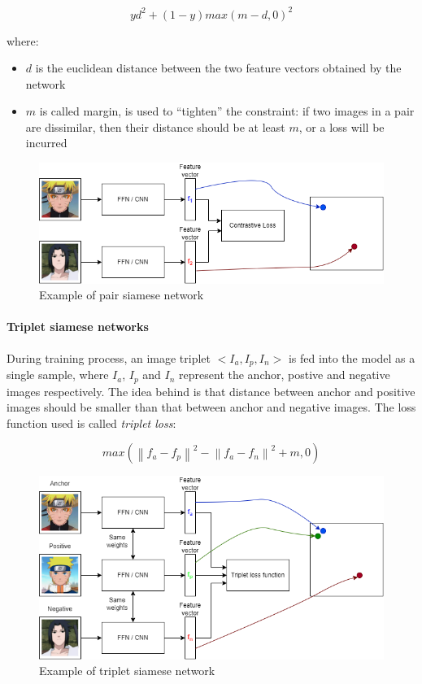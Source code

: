 \documentclass{article}
\begin{document}
$$yd^2 + (1 - y) max(m - d, 0)^2$$

where:
\begin{itemize}
    \item $d$ is the euclidean distance between the two feature vectors obtained by the network
    \item $m$ is called margin, is used to “tighten” the constraint: if two images in a pair are dissimilar, then their distance should be at least $m$, or a loss will be incurred
\end{itemize}

\begin{figure}[H]
    \centering
    \includegraphics[width=4.5in]{imgs/pairNet.png}
    \caption{Example of pair siamese network}
    \label{fig:pairNet}
\end{figure}

\paragraph{Triplet siamese networks}
During training process, an image triplet $<I_a, I_p, I_n>$ is fed into the model as a single sample, where $I_a$, $I_p$ and $I_n$ represent the anchor, postive and negative images respectively. The idea behind is that distance between anchor and positive images should be smaller than that between anchor and negative images.
The loss function used is called \textit{triplet loss}:

$$max(\left\| f_a - f_p\right\|^2 - \left\| f_a - f_n\right\|^2 + m, 0) $$

\begin{figure}[H]
    \centering
    \includegraphics[width=4.5in]{imgs/TripletNet.png}
    \caption{Example of triplet siamese network}
    \label{fig:tripletNet}
\end{figure}
\end{document}
